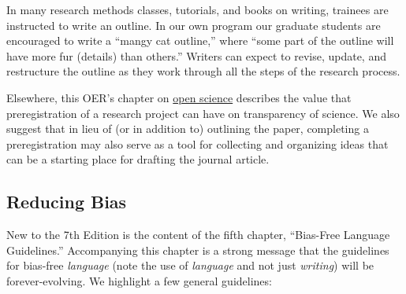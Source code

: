 \documentclass[
  11pt,
]{book}
\begin{document}
In many research methods classes, tutorials, and books on writing, trainees are instructed to write an outline. In our own program our graduate students are encouraged to write a ``mangy cat outline,'' where ``some part of the outline will have more fur (details) than others.'' Writers can expect to revise, update, and restructure the outline as they work through all the steps of the research process.

Elsewhere, this OER's chapter on \protect\hyperlink{OpSci}{open science} describes the value that preregistration of a research project can have on transparency of science. We also suggest that in lieu of (or in addition to) outlining the paper, completing a preregistration may also serve as a tool for collecting and organizing ideas that can be a starting place for drafting the journal article.

\hypertarget{reducing-bias}{%
\subsection{Reducing Bias}\label{reducing-bias}}

New to the 7th Edition is the content of the fifth chapter, ``Bias-Free Language Guidelines.'' Accompanying this chapter is a strong message that the guidelines for bias-free \emph{language} (note the use of \emph{language} and not just \emph{writing}) will be forever-evolving. We highlight a few general guidelines:
\end{document}

